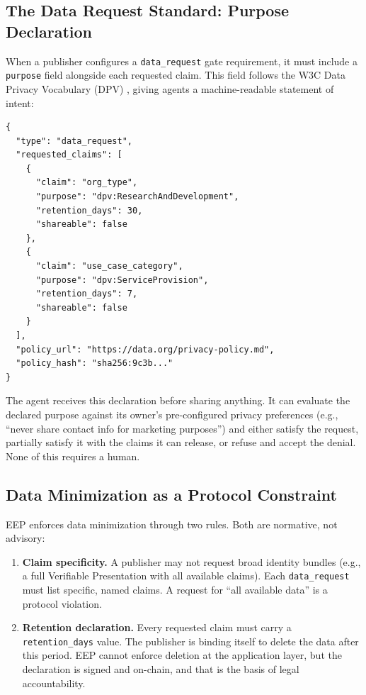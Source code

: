 \documentclass[12pt,a4paper]{article}
\begin{document}
\subsection{The Data Request Standard: Purpose Declaration}

When a publisher configures a \texttt{data\_request} gate requirement, it must include a \texttt{purpose} field alongside each requested claim. This field follows the W3C Data Privacy Vocabulary (DPV) \cite{ref14}, giving agents a machine-readable statement of intent:

\begin{lstlisting}[language=EEPJson,style=eepcode]
{
  "type": "data_request",
  "requested_claims": [
    {
      "claim": "org_type",
      "purpose": "dpv:ResearchAndDevelopment",
      "retention_days": 30,
      "shareable": false
    },
    {
      "claim": "use_case_category",
      "purpose": "dpv:ServiceProvision",
      "retention_days": 7,
      "shareable": false
    }
  ],
  "policy_url": "https://data.org/privacy-policy.md",
  "policy_hash": "sha256:9c3b..."
}
\end{lstlisting}

The agent receives this declaration before sharing anything. It can evaluate the declared purpose against its owner's pre-configured privacy preferences (e.g., ``never share contact info for marketing purposes'') and either satisfy the request, partially satisfy it with the claims it can release, or refuse and accept the denial. None of this requires a human.

\subsection{Data Minimization as a Protocol Constraint}

EEP enforces data minimization through two rules. Both are normative, not advisory:

\begin{enumerate}
    \item \textbf{Claim specificity.} A publisher may not request broad identity bundles (e.g., a full Verifiable Presentation with all available claims). Each \texttt{data\_request} must list specific, named claims. A request for ``all available data'' is a protocol violation.
    \item \textbf{Retention declaration.} Every requested claim must carry a \texttt{retention\_days} value. The publisher is binding itself to delete the data after this period. EEP cannot enforce deletion at the application layer, but the declaration is signed and on-chain, and that is the basis of legal accountability.
\end{enumerate}
\end{document}
